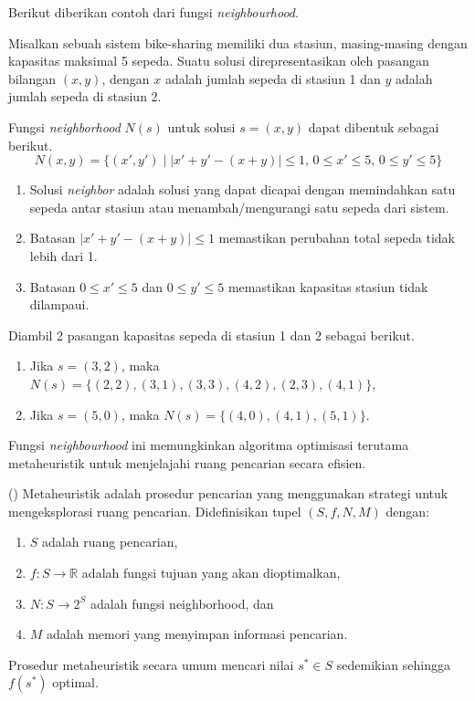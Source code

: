 Berikut diberikan contoh dari fungsi \textit{neighbourhood}.

\begin{contoh}
    Misalkan sebuah sistem bike-sharing memiliki dua stasiun, masing-masing dengan kapasitas maksimal 5 sepeda. Suatu solusi direpresentasikan oleh pasangan bilangan $(x, y)$, dengan $x$ adalah jumlah sepeda di stasiun 1 dan $y$ adalah jumlah sepeda di stasiun 2.
    
    Fungsi \textit{neighborhood} $N(s)$ untuk solusi $s = (x, y)$ dapat dibentuk sebagai berikut.
    \[
    N(x, y) = \{(x', y') \mid |x' + y' - (x + y)| \leq 1, \, 0 \leq x' \leq 5, \, 0 \leq y' \leq 5\}
    \]
    \begin{enumerate}
        \item Solusi \textit{neighbor} adalah solusi yang dapat dicapai dengan memindahkan satu sepeda antar stasiun atau menambah/mengurangi satu sepeda dari sistem.
        \item Batasan $|x' + y' - (x + y)| \leq 1$ memastikan perubahan total sepeda tidak lebih dari 1.
        \item Batasan $0 \leq x' \leq 5$ dan $0 \leq y' \leq 5$ memastikan kapasitas stasiun tidak dilampaui.
    \end{enumerate}
    Diambil 2 pasangan kapasitas sepeda di stasiun 1 dan 2 sebagai berikut.
    \begin{enumerate}
        \item Jika $s = (3, 2)$, maka $N(s) = \{(2, 2), (3, 1), (3, 3), (4, 2), (2, 3), (4, 1)\}$,
        \item Jika $s = (5, 0)$, maka $N(s) = \{(4, 0), (4, 1), (5, 1)\}$.
    \end{enumerate}
\end{contoh}

Fungsi \textit{neighbourhood} ini memungkinkan algoritma optimisasi terutama metaheuristik untuk menjelajahi ruang pencarian secara efisien.

\begin{definisi} ()
    Metaheuristik adalah prosedur pencarian yang menggunakan strategi untuk mengeksplorasi ruang pencarian. Didefinisikan tupel $(S, f, N, M)$ dengan:
    \begin{enumerate}
    \item $S$ adalah ruang pencarian,
    \item $f: S \rightarrow \mathbb{R}$ adalah fungsi tujuan yang akan dioptimalkan,
    \item $N: S \rightarrow 2^S$ adalah fungsi neighborhood, dan
    \item $M$ adalah memori yang menyimpan informasi pencarian.
    \end{enumerate}
    Prosedur metaheuristik secara umum mencari nilai $s^* \in S$ sedemikian sehingga $f(s^*)$ optimal.
\end{definisi}

